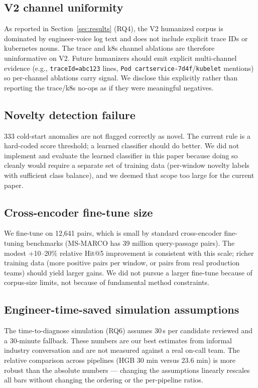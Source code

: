 \subsection{V2 channel uniformity}

As reported in Section~\ref{sec:results} (RQ4), the V2 humanized corpus is dominated by engineer-voice log text and does not include explicit trace IDs or kubernetes nouns. The trace and k8s channel ablations are therefore uninformative on V2. Future humanizers should emit explicit multi-channel evidence (e.g., \texttt{traceId=abc123} lines, \texttt{Pod cartservice-7d4f}/\texttt{kubelet} mentions) so per-channel ablations carry signal. We disclose this explicitly rather than reporting the trace/k8s no-ops as if they were meaningful negatives.

\subsection{Novelty detection failure}

333 cold-start anomalies are not flagged correctly as novel. The current rule is a hard-coded score threshold; a learned classifier should do better. We did not implement and evaluate the learned classifier in this paper because doing so cleanly would require a separate set of training data (per-window novelty labels with sufficient class balance), and we deemed that scope too large for the current paper.

\subsection{Cross-encoder fine-tune size}

We fine-tune on 12{,}641 pairs, which is small by standard cross-encoder fine-tuning benchmarks (MS-MARCO has 39 million query-passage pairs). The modest +10--20\% relative Hit@5 improvement is consistent with this scale; richer training data (more positive pairs per window, or pairs from real production teams) should yield larger gains. We did not pursue a larger fine-tune because of corpus-size limits, not because of fundamental method constraints.

\subsection{Engineer-time-saved simulation assumptions}

The time-to-diagnose simulation (RQ6) assumes 30\,s per candidate reviewed and a 30-minute fallback. These numbers are our best estimates from informal industry conversation and are not measured against a real on-call team. The relative comparison across pipelines (HGB 30 min versus \sotaft{} 23.6 min) is more robust than the absolute numbers --- changing the assumptions linearly rescales all bars without changing the ordering or the per-pipeline ratios.

